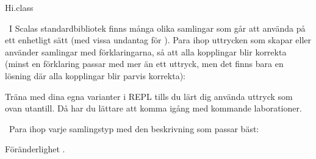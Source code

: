 \begin{ConceptConnections}

\end{ConceptConnections}

\SOLUTION


\TaskSolved \what


\SubtaskSolved  Hi.class

\SubtaskSolved

\begin{ConceptConnections}

\end{ConceptConnections}


\QUESTEND





\QUESTBEGIN

\Task \what~I Scalas standardbibliotek finns många olika samlingar som går att använda på ett enhetligt sätt (med vissa undantag för ). Para ihop uttrycken som skapar eller använder samlingar med förklaringarna, så att alla kopplingar blir korrekta (minst en förklaring passar med mer än ett uttryck, men det finns bara en lösning där alla kopplingar blir parvis korrekta):

\begin{ConceptConnections}

\end{ConceptConnections}

\noindent Träna med dina egna varianter i REPL tills du lärt dig använda uttryck som ovan utantill. Då har du lättare att komma igång med kommande laborationer.

\SOLUTION

\TaskSolved \what

\begin{ConceptConnections}

\end{ConceptConnections}

\QUESTEND






\QUESTBEGIN

\Task \what~Para ihop varje samlingstyp med den beskrivning som passar bäst:

\Subtask Föränderlighet .

